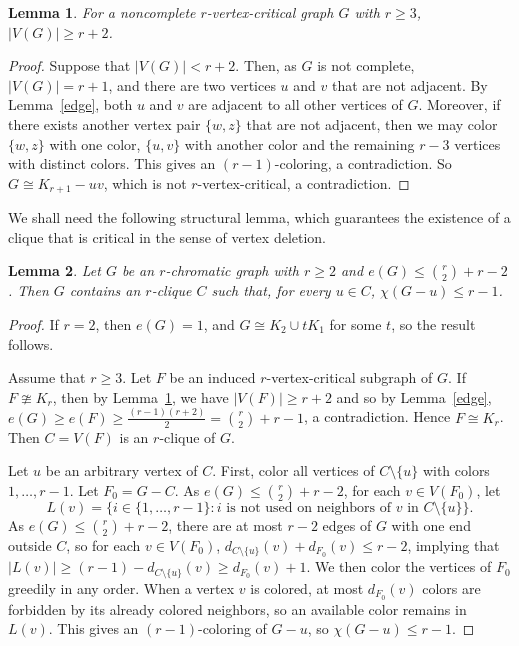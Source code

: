 \documentclass[10pt,a4paper]{amsart}
\newtheorem{lemma}{Lemma}[section]
\begin{document}
\begin{lemma}\label{order}
For a noncomplete  $r$-vertex-critical graph $G$ with  $r\ge 3$, $|V(G)|\ge r+2$. 
\end{lemma}
\begin{proof}  Suppose that  $|V(G)|< r+2$. Then, as $G$ is not complete, $|V(G)|=r+1$, and there are two vertices $u$ and $v$ that  are not adjacent. By Lemma~\ref{edge}, both $u$ and $v$ are adjacent to all other vertices of $G$. Moreover, if there exists another vertex pair $\{w,z\}$ that are not adjacent, then we may color $\{w,z\}$ with one color, $\{u,v\}$ with another color and the remaining $r-3$ vertices with distinct colors. This gives an $(r-1)$-coloring, a contradiction. So $G\cong K_{r+1}-uv$, which is not $r$-vertex-critical, a contradiction. 
\end{proof}



We shall need the following structural lemma, which guarantees the existence of a clique that is critical in the sense of vertex deletion. 

\begin{lemma}\label{lem:small-extremal-coloring}
Let $G$ be an $r$-chromatic graph with $r\ge 2$ and $e(G) \le \binom{r}{2}+r-2$.
Then $G$ contains an $r$-clique $C$ such that, for every $u\in C$,
$\chi(G-u)\le r-1$.
\end{lemma}

\begin{proof}
If $r=2$, then $e(G)=1$, and $G\cong K_2\cup tK_1$ for some $t$, so the result follows. 

Assume that $r\ge 3$. 
Let $F$ be an induced $r$-vertex-critical subgraph of $G$. 
If $F\ncong K_r$, then by Lemma~\ref{order}, we have $|V(F)|\ge r+2$ and so by Lemma~\ref{edge}, $e(G)\ge e(F)\ge \frac{(r-1)(r+2)}{2}=\binom{r}{2}+r-1$, a contradiction. Hence $F\cong K_r$. Then $C=V(F)$ is an $r$-clique of $G$.

Let $u$ be an arbitrary vertex of $C$.
First, color all vertices of $C\setminus\{u\}$ with  colors $1,\dots, r-1$. Let $F_0=G-C$. As $e(G) \le \binom{r}{2}+r-2$, for each $v\in V(F_0)$, let 
\[
L(v)=\{i\in \{1,\dots, r-1\}: \text{$i$ is not used on neighbors of $v$ in $C\setminus\{u\}$}\}. 
\]
As $e(G)\le \binom{r}{2}+r-2$, there are at most $r-2$ edges of $G$ with one end outside $C$, so for each $v\in V(F_0)$,
$d_{C\setminus\{u\}}(v)+d_{F_0}(v)\le r-2$, implying that 
$|L(v)|\ge (r-1)-d_{C\setminus\{u\}}(v)\ge d_{F_0}(v)+1$.
We then color the vertices of $F_0$ greedily in any order. When a vertex $v$ is colored, at most $d_{F_0}(v)$ colors are forbidden by its already colored neighbors, so an available color remains
in $L(v)$. This gives an $(r-1)$-coloring of $G-u$, so $\chi(G-u)\le r-1$.
\end{proof}
\end{document}
